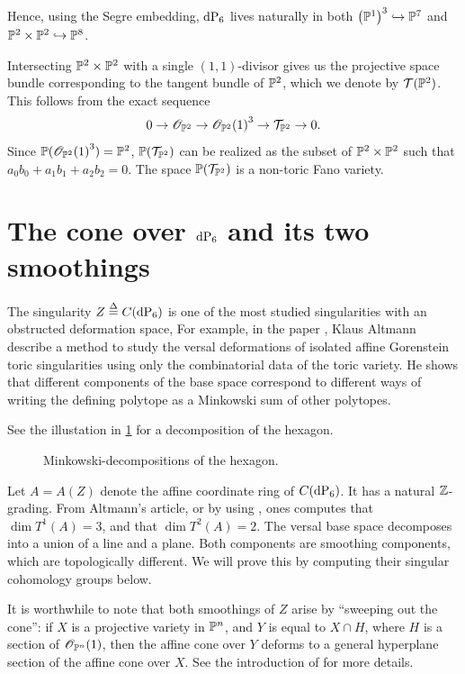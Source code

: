Hence, using the Segre embedding, $\dP6$ lives naturally in both ${\left( \P^1 \right)}^3 \hookrightarrow \P^7$ and $\P^2 \times \P^2 \hookrightarrow \P^8$. 

\begin{remark}
Intersecting $\P^2 \times \P^2$ with a single $(1,1)$-divisor gives us the projective space bundle corresponding to the tangent bundle of $\P^2$, which we denote by $\mathcal T(\P^2)$. This follows from the exact sequence
\[
0 \to \OO_{\P^2} \to {\OO_{\P^2}(1)}^3 \to \mathcal T_{\P^2} \to 0.
\]
Since $\P({\OO_{\P^2}(1)}^3)=\P^2$,  $\P(\mathcal T_{\P^2})$ can be realized as the subset of $\P^2 \times \P^2$ such that $a_0b_0+a_1b_1+a_2b_2=0$. The space $\P(\mathcal T_{\P^2})$ is a non-toric Fano variety.
\end{remark}

\section{The cone over \texorpdfstring{$\dP6$}{dP6} and its two smoothings}

The singularity $Z\stackrel{\Delta}{=} C(\dP6)$ is one of the most studied singularities with an obstructed deformation space, For example, in the paper \cite{altmann_versaldeformation}, Klaus Altmann describe a method to study the versal deformations of isolated affine Gorenstein toric singularities using only the combinatorial data of the toric variety. He shows that different components of the base space correspond to different ways of writing the defining polytope as a Minkowski sum of other polytopes.

See the illustation in \cref{fig:minkowski_decompositions} for a decomposition of the hexagon.

\begin{figure}
\centering 

\caption{Minkowski-decompositions of the hexagon.}
\label{fig:minkowski_decompositions}
\end{figure}

Let $A=A(Z)$ denote the affine coordinate ring of $C(\dP6)$. It has a natural $\Z$-grading. From Altmann's article, or by using \MM, ones computes that $\dim T^1(A)=3$, and that $\dim T^2(A)=2$. The versal base space decomposes into a union of a line and a plane. Both components are smoothing components, which are topologically different. We will prove this by computing their singular cohomology groups below.

It is worthwhile to note that both smoothings of $Z$ arise by ``sweeping out the cone'': if $X$ is a projective variety in $\P^n$, and $Y$ is equal to $X \cap H$, where $H$ is a section of $\OO_{\P^n}(1)$, then the affine cone over $Y$ deforms to a general hyperplane section of the affine cone over $X$. See the introduction of \cite{stevens_deformations} for more details.

